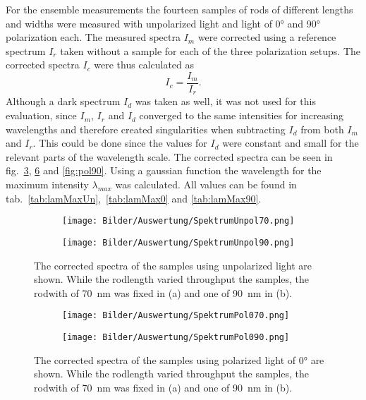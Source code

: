 

For the ensemble measurements the fourteen samples of rods of different lengths and widths were measured with unpolarized light and light of \ang{0} and \ang{90} polarization each. The measured spectra $I_m$ were corrected using a reference spectrum $I_r$ taken without a sample for each of the three polarization setups. The corrected spectra $I_c$ were thus calculated as
\begin{equation}
    I_c = \frac{I_m}{I_r}.
\end{equation}
Although a dark spectrum $I_d$ was taken as well, it was not used for this evaluation, since $I_m$, $I_r$ and $I_d$ converged to the same intensities for increasing wavelengths and therefore created singularities when subtracting $I_d$ from both $I_m$ and $I_r$. This could be done since the values for $I_d$ were constant and small for the relevant parts of the wavelength scale. The corrected spectra can be seen in fig.~\ref{fig:unpol}, \ref{fig:pol0} and \ref{fig:pol90}. Using a gaussian function the wavelength for the maximum intensity $\lambda_{max}$ was calculated. All values can be found in tab.~\ref{tab:lamMaxUn},~\ref{tab:lamMax0} and \ref{tab:lamMax90}.

\begin{figure}
    \centering
    \begin{subfigure}{\textwidth}
        \texttt{[image: Bilder/Auswertung/SpektrumUnpol70.png]}
        \caption{ }
        \label{fig:u70}
    \end{subfigure}
    \hfill
    \begin{subfigure}{\textwidth}
        \texttt{[image: Bilder/Auswertung/SpektrumUnpol90.png]}
        \caption{ }
        \label{fig:u90}
    \end{subfigure}
    \caption{The corrected spectra of the samples using unpolarized light are shown. While the rodlength varied throughput the samples, the rodwith of \SI{70}{\nano\meter} was fixed in (a) and one of \SI{90}{\nano\meter} in (b).}
    \label{fig:unpol}
\end{figure}

\begin{figure}
    \centering
    \begin{subfigure}{\textwidth}
        \texttt{[image: Bilder/Auswertung/SpektrumPol070.png]}
        \caption{ }
        \label{fig:0-70}
    \end{subfigure}
    \hfill
    \begin{subfigure}{\textwidth}
        \texttt{[image: Bilder/Auswertung/SpektrumPol090.png]}
        \caption{ }
        \label{fig:0-90}
    \end{subfigure}
    \caption{The corrected spectra of the samples using polarized light of \ang{0} are shown. While the rodlength varied throughput the samples, the rodwith of \SI{70}{\nano\meter} was fixed in (a) and one of \SI{90}{\nano\meter} in (b).}
    \label{fig:pol0}
\end{figure}

